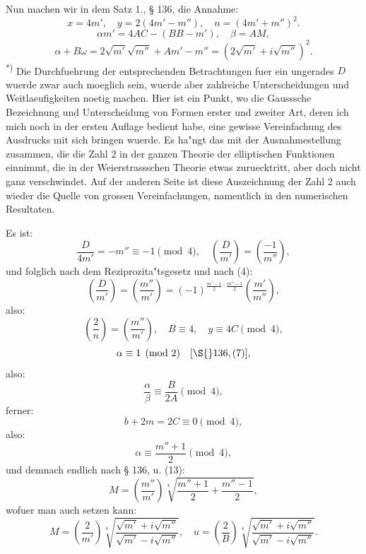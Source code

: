 \documentclass[12pt,a4paper]{article}
\theoremstyle{plain}
\theoremstyle{definition}
\theoremstyle{remark}
\begin{document}
Nun machen wir in dem Satz 1., \S{} 136, die Annahme:
\begin{equation}\label{eq:138_3}
x = 4m', \quad y = 2(4m' - m''), \quad n = (4m' + m'')^2.
\end{equation}
\begin{equation}\label{eq:138_4}
\alpha m' = 4AC - (BB - m'), \quad \beta = AM,
\end{equation}
\[
\alpha + B\omega = 2\sqrt{m'}\sqrt{m''} + Am' - m'' = (2\sqrt{m'} + i\sqrt{m''})^2.
\]
\textsuperscript{*)} Die Durchfuehrung der entsprechenden Betrachtungen fuer ein ungerades $D$ wuerde zwar auch moeglich sein, wuerde aber zahlreiche Unterscheidungen und Weitlaeufigkeiten noetig machen. Hier ist ein Punkt, wo die Gausssche Bezeichnung und Unterscheidung von Formen erster und zweiter Art, deren ich mich noch in der ersten Auflage bedient habe, eine gewisse Vereinfachung des Ausdrucks mit sich bringen wuerde. Es ha"ngt das mit der Ausnahmestellung zusammen, die die Zahl 2 in der ganzen Theorie der elliptischen Funktionen einnimmt, die in der Weierstrassschen Theorie etwas zuruecktritt, aber doch nicht ganz verschwindet. Auf der anderen Seite ist diese Auszeichnung der Zahl 2 auch wieder die Quelle von grossen Vereinfachungen, namentlich in den numerischen Resultaten.

Es ist:
\[
\frac{D}{4m'} = -m'' \equiv -1 \pmod{4}, \quad \left(\frac{D}{m'}\right) = \left(\frac{-1}{m''}\right),
\]
und folglich nach dem Reziprozita"tsgesetz und nach (4):
\[
\left(\frac{D}{m'}\right) = \left(\frac{m''}{m'}\right) = (-1)^{\frac{m'-1}{2} \cdot \frac{m''-1}{2}} \left(\frac{m'}{m''}\right),
\]
also:
\begin{equation}\label{eq:138_6}
\left(\frac{2}{n}\right) = \left(\frac{m''}{m'}\right), \quad B \equiv 4, \quad y \equiv 4C \pmod{4},
\end{equation}
\[
\alpha \equiv 1 \pmod{2} \quad [\S{} 136, (7)],
\]
also:
\[
\frac{\alpha}{\beta} \equiv \frac{B}{2A} \pmod{4},
\]
ferner:
\[
b + 2m = 2C \equiv 0 \pmod{4},
\]
also:
\[
\alpha \equiv \frac{m'' + 1}{2} \pmod{4},
\]
und demnach endlich nach \S{} 136, u. (13):
\[
M = \left(\frac{m''}{m'}\right) \sqrt[4]{\frac{m'' + 1}{2} + \frac{m'' - 1}{2}},
\]
wofuer man auch setzen kann:
\begin{equation}\label{eq:138_8}
M = \left(\frac{2}{m'}\right) \sqrt[4]{\frac{\sqrt{m'} + i\sqrt{m''}}{\sqrt{m'} - i\sqrt{m''}}}, \quad u = \left(\frac{2}{B}\right) \sqrt[4]{\frac{\sqrt{m'} + i\sqrt{m''}}{\sqrt{m'} - i\sqrt{m''}}}.
\end{equation}
\end{document}
